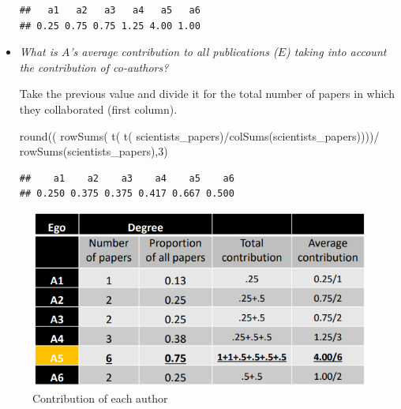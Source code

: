 \documentclass[
  notitlepage,
  onecolumn,
  openany]{book}
\newenvironment{Shaded}{\begin{snugshade}}{\end{snugshade}}
\newcommand{\DecValTok}[1]{\textcolor[rgb]{0.00,0.00,0.81}{#1}}
\newcommand{\FunctionTok}[1]{\textcolor[rgb]{0.00,0.00,0.00}{#1}}
\newcommand{\NormalTok}[1]{#1}
\newcommand{\SpecialCharTok}[1]{\textcolor[rgb]{0.00,0.00,0.00}{#1}}
\begin{document}
\begin{itemize}
\begin{verbatim}
##   a1   a2   a3   a4   a5   a6 
## 0.25 0.75 0.75 1.25 4.00 1.00
\end{verbatim}
\item
  \emph{What is \(A\)'s average contribution to all publications (\(E\)) taking into account the contribution of co-authors?}

  Take the previous value and divide it for the total number of papers in which they collaborated (first column).

\begin{Shaded}
\begin{Highlighting}[]
\FunctionTok{round}\NormalTok{((}
  \FunctionTok{rowSums}\NormalTok{(}
    \FunctionTok{t}\NormalTok{(}
      \FunctionTok{t}\NormalTok{(}
\NormalTok{        scientists\_papers)}\SpecialCharTok{/}\FunctionTok{colSums}\NormalTok{(scientists\_papers))))}\SpecialCharTok{/}
    \FunctionTok{rowSums}\NormalTok{(scientists\_papers),}\DecValTok{3}\NormalTok{) }
\end{Highlighting}
\end{Shaded}

\begin{verbatim}
##    a1    a2    a3    a4    a5    a6 
## 0.250 0.375 0.375 0.417 0.667 0.500
\end{verbatim}
\end{itemize}

\begin{figure}[h!]

{\centering \includegraphics[width=0.7\linewidth]{images/10-Two mode networks/Untitled 5} 

}

\caption{Contribution of each author}\label{fig:unnamed-chunk-74}
\end{figure}
\end{document}

